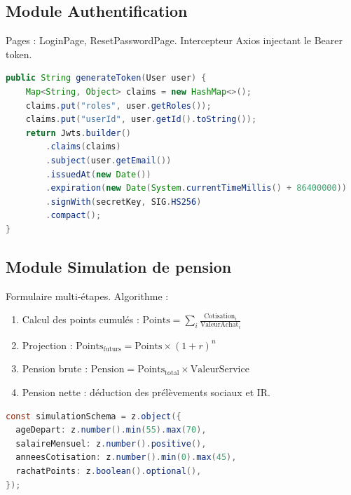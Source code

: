 \documentclass[12pt,a4paper,oneside]{report}
\begin{document}
\subsection{Module Authentification}
Pages : LoginPage, ResetPasswordPage. Intercepteur Axios injectant le Bearer token.

\begin{lstlisting}[language=Java,caption={Génération du JWT}]
public String generateToken(User user) {
    Map<String, Object> claims = new HashMap<>();
    claims.put("roles", user.getRoles());
    claims.put("userId", user.getId().toString());
    return Jwts.builder()
        .claims(claims)
        .subject(user.getEmail())
        .issuedAt(new Date())
        .expiration(new Date(System.currentTimeMillis() + 86400000))
        .signWith(secretKey, SIG.HS256)
        .compact();
}
\end{lstlisting}

\subsection{Module Simulation de pension}
Formulaire multi-étapes. Algorithme :
\begin{enumerate}
    \item Calcul des points cumulés : $\text{Points} = \sum_i \frac{\text{Cotisation}_i}{\text{ValeurAchat}_i}$
    \item Projection : $\text{Points}_{\text{futurs}} = \text{Points} \times (1 + r)^n$
    \item Pension brute : $\text{Pension} = \text{Points}_{\text{total}} \times \text{ValeurService}$
    \item Pension nette : déduction des prélèvements sociaux et IR.
\end{enumerate}

\begin{lstlisting}[language=Java,caption={Validation Zod côté frontend}]
const simulationSchema = z.object({
  ageDepart: z.number().min(55).max(70),
  salaireMensuel: z.number().positive(),
  anneesCotisation: z.number().min(0).max(45),
  rachatPoints: z.boolean().optional(),
});
\end{lstlisting}
\end{document}
